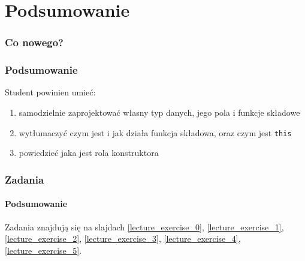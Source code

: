 \documentclass[aspectratio=169,10pt]{beamer}
\begin{document}
\section{Podsumowanie}

\begin{frame}
    \frametitle{Co nowego?}
    \frametitle{Podsumowanie}

    Student powinien umieć:

    \begin{enumerate}
        \item samodzielnie zaprojektować własny typ danych, jego pola i funkcje
            składowe
        \item wytłumaczyć czym jest i jak działa funkcja składowa, oraz czym
            jest {\tt this}
        \item powiedzieć jaka jest rola konstruktora
    \end{enumerate}
\end{frame}

\begin{frame}
    \frametitle{Zadania}
    \framesubtitle{Podsumowanie}

    Zadania znajdują się na slajdach
    \ref{lecture_exercise_0},
    \ref{lecture_exercise_1},
    \ref{lecture_exercise_2},
    \ref{lecture_exercise_3},
    \ref{lecture_exercise_4},
    \ref{lecture_exercise_5}.
\end{frame}
\end{document}
